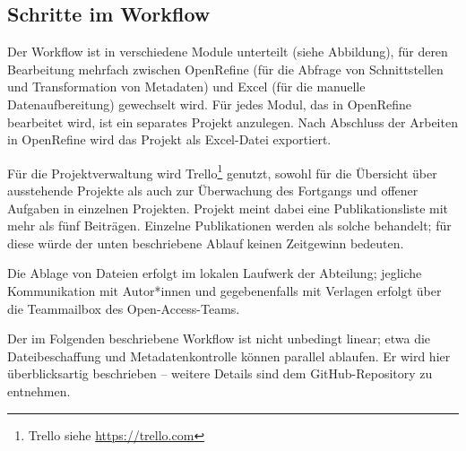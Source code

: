 \documentclass[a4paper,
fontsize=11pt,
oneside,
numbers=noperiodatend,
parskip=half-,
bibliography=totoc,
final
]{scrartcl}
\begin{document}
\hypertarget{schritte-im-workflow}{%
\subsection{Schritte im Workflow}\label{schritte-im-workflow}}

Der Workflow ist in verschiedene Module unterteilt (siehe Abbildung),
für deren Bearbeitung mehrfach zwischen OpenRefine (für die Abfrage von
Schnittstellen und Transformation von Metadaten) und Excel (für die
manuelle Datenaufbereitung) gewechselt wird. Für jedes Modul, das in
OpenRefine bearbeitet wird, ist ein separates Projekt anzulegen. Nach
Abschluss der Arbeiten in OpenRefine wird das Projekt als Excel-Datei
exportiert.

Für die Projektverwaltung wird Trello\footnote{Trello siehe
  \url{https://trello.com}} genutzt, sowohl für die Übersicht über
ausstehende Projekte als auch zur Überwachung des Fortgangs und offener
Aufgaben in einzelnen Projekten. Projekt meint dabei eine
Publikationsliste mit mehr als fünf Beiträgen. Einzelne Publikationen
werden als solche behandelt; für diese würde der unten beschriebene
Ablauf keinen Zeitgewinn bedeuten.

Die Ablage von Dateien erfolgt im lokalen Laufwerk der Abteilung;
jegliche Kommunikation mit Autor*innen und gegebenenfalls mit Verlagen
erfolgt über die Teammailbox des Open-Access-Teams.

Der im Folgenden beschriebene Workflow ist nicht unbedingt linear; etwa
die Dateibeschaffung und Metadatenkontrolle können parallel ablaufen. Er
wird hier überblicksartig beschrieben -- weitere Details sind dem
GitHub-Repository zu entnehmen.
\end{document}
